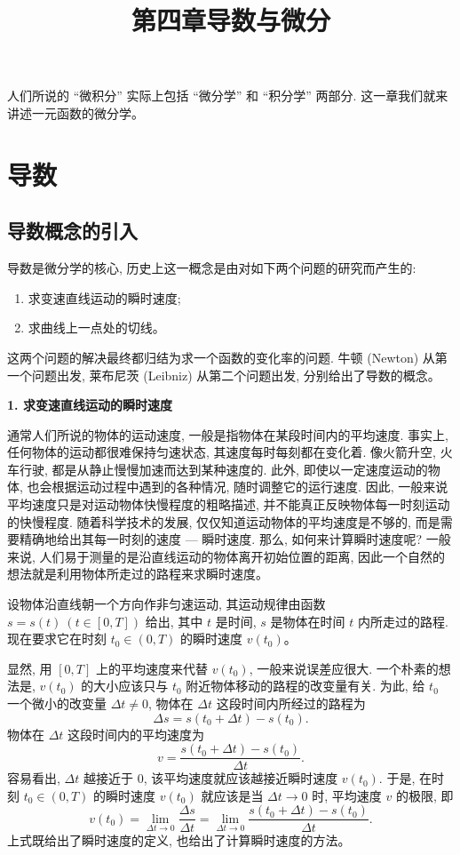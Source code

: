 \documentclass[UTF8, 12pt, fontset=fandol, oneside]{ctexart}
\title{第四章\quad 导数与微分}
\author{}
\date{}
\begin{document}
\maketitle

人们所说的 ``微积分'' 实际上包括 ``微分学'' 和 ``积分学'' 两部分. 这一章我们就来讲述一元函数的微分学。

\section{导数}

\subsection{导数概念的引入}

导数是微分学的核心, 历史上这一概念是由对如下两个问题的研究而产生的:
\begin{enumerate}
  \item 求变速直线运动的瞬时速度;
  \item 求曲线上一点处的切线。
\end{enumerate}
这两个问题的解决最终都归结为求一个函数的变化率的问题. 牛顿 (Newton) 从第一个问题出发, 莱布尼茨 (Leibniz) 从第二个问题出发, 分别给出了导数的概念。

\noindent\textbf{1. 求变速直线运动的瞬时速度}

通常人们所说的物体的运动速度, 一般是指物体在某段时间内的平均速度. 事实上, 任何物体的运动都很难保持匀速状态, 其速度每时每刻都在变化着. 像火箭升空, 火车行驶, 都是从静止慢慢加速而达到某种速度的. 此外, 即使以一定速度运动的物体, 也会根据运动过程中遇到的各种情况, 随时调整它的运行速度. 因此, 一般来说平均速度只是对运动物体快慢程度的粗略描述, 并不能真正反映物体每一时刻运动的快慢程度. 随着科学技术的发展, 仅仅知道运动物体的平均速度是不够的, 而是需要精确地给出其每一时刻的速度 --- 瞬时速度. 那么, 如何来计算瞬时速度呢? 一般来说, 人们易于测量的是沿直线运动的物体离开初始位置的距离, 因此一个自然的想法就是利用物体所走过的路程来求瞬时速度。

设物体沿直线朝一个方向作非匀速运动, 其运动规律由函数 $s=s(t)\ (t\in[0,T])$ 给出, 其中 $t$ 是时间, $s$ 是物体在时间 $t$ 内所走过的路程. 现在要求它在时刻 $t_0\in(0,T)$ 的瞬时速度 $v(t_0)$。

显然, 用 $[0,T]$ 上的平均速度来代替 $v(t_0)$, 一般来说误差应很大. 一个朴素的想法是, $v(t_0)$ 的大小应该只与 $t_0$ 附近物体移动的路程的改变量有关. 为此, 给 $t_0$ 一个微小的改变量 $\Delta t\ne0$, 物体在 $\Delta t$ 这段时间内所经过的路程为
\[
  \Delta s=s(t_0+\Delta t)-s(t_0).
\]
物体在 $\Delta t$ 这段时间内的平均速度为
\[
  v=\frac{s(t_0+\Delta t)-s(t_0)}{\Delta t}.
\]
容易看出, $\Delta t$ 越接近于 $0$, 该平均速度就应该越接近瞬时速度 $v(t_0)$. 于是, 在时刻 $t_0\in(0,T)$ 的瞬时速度 $v(t_0)$ 就应该是当 $\Delta t\to0$ 时, 平均速度 $v$ 的极限, 即
\[
  v(t_0)
  =
  \lim_{\Delta t\to0}\frac{\Delta s}{\Delta t}
  =
  \lim_{\Delta t\to0}
  \frac{s(t_0+\Delta t)-s(t_0)}{\Delta t}.
\]
上式既给出了瞬时速度的定义, 也给出了计算瞬时速度的方法。
\end{document}
